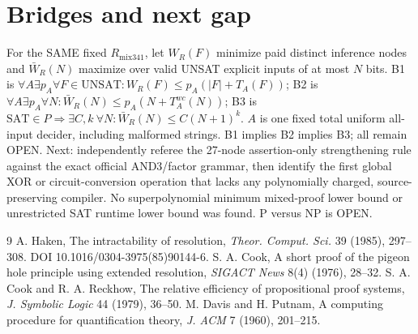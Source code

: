 \documentclass[11pt]{article}
\begin{document}
\section*{Bridges and next gap}
For the SAME fixed $R_{\mathrm{mix341}}$, let $W_R(F)$ minimize paid distinct inference nodes and $\bar W_R(N)$ maximize over valid UNSAT explicit inputs of at most $N$ bits. B1 is $\forall A\exists p_A\forall F\in\mathrm{UNSAT}:W_R(F)\le p_A(|F|+T_A(F))$; B2 is $\forall A\exists p_A\forall N:\bar W_R(N)\le p_A(N+T_A^{wc}(N))$; B3 is $\mathrm{SAT}\in P\Rightarrow\exists C,k\ \forall N:\bar W_R(N)\le C(N+1)^k$. $A$ is one fixed total uniform all-input decider, including malformed strings. B1 implies B2 implies B3; all remain OPEN. Next: independently referee the 27-node assertion-only strengthening rule against the exact official AND3/factor grammar, then identify the first global XOR or circuit-conversion operation that lacks any polynomially charged, source-preserving compiler. No superpolynomial minimum mixed-proof lower bound or unrestricted SAT runtime lower bound was found. P versus NP is OPEN.

\begin{thebibliography}{9}
 A. Haken, The intractability of resolution, \emph{Theor. Comput. Sci.} 39 (1985), 297--308. DOI 10.1016/0304-3975(85)90144-6.
 S. A. Cook, A short proof of the pigeon hole principle using extended resolution, \emph{SIGACT News} 8(4) (1976), 28--32.
 S. A. Cook and R. A. Reckhow, The relative efficiency of propositional proof systems, \emph{J. Symbolic Logic} 44 (1979), 36--50.
 M. Davis and H. Putnam, A computing procedure for quantification theory, \emph{J. ACM} 7 (1960), 201--215.
\end{thebibliography}
\end{document}

